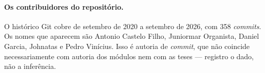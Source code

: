 \paragraph{Os contribuidores do reposit\'orio.} O hist\'orico Git cobre de
setembro de 2020 a setembro de 2026, com 358 \emph{commits}. Os nomes que
aparecem s\~ao Antonio Castelo Filho, Juniormar Organista, Daniel Garcia,
Johnatas e Pedro Vin\'icius. Isso \'e autoria de \emph{commit}, que n\~ao
coincide necessariamente com autoria dos m\'odulos nem com as teses ---
registro o dado, n\~ao a infer\^encia.

